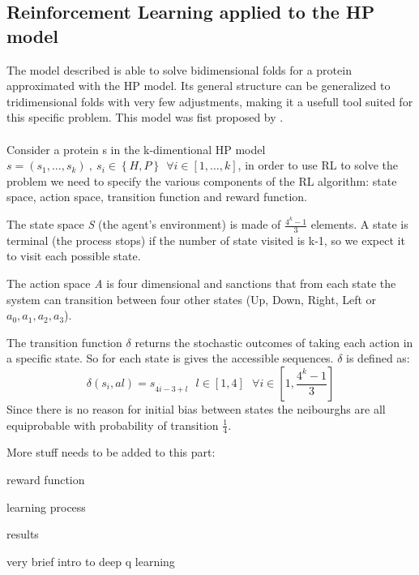 \subsection{Reinforcement Learning applied to the HP model}

The model described is able to solve bidimensional folds for a protein approximated with the HP model. Its general structure can be generalized to tridimensional folds with very few adjustments, making it a usefull tool suited for this specific problem. This model was fist proposed by \cite{czibula2011reinforcement}.
\\
\\
Consider a protein s in the k-dimentional HP model $s = \left(s_1, \ldots, s_k\right) \ , \ s_i \in \left\{H, P\right\} \ \ \forall i \in \left[1,\ldots,k\right]$, in order to use RL to solve the problem we need to specify the various components of the RL algorithm: state space, action space, transition function and reward function.

The state space \emph{S} (the agent’s environment) is made of $\frac{4^{k}-1}{3}$ elements. A state is terminal (the process stops) if the number of state visited is k-1, so we expect it to visit each possible state. 

The action space \emph{A} is four dimensional and sanctions that from each state the system can transition between four other states (Up, Down, Right, Left or $a_{0}, a_{1}, a_{2}, a_{3}$).

The transition function $\delta$ returns the stochastic outcomes of taking each action in a specific state. So for each state is gives the accessible sequences. $\delta$ is defined as:
\begin{equation}
\delta(s_{i},a{l})=s_{4 \dot i - 3 + l} \ \ \ l \in [1, 4] \ \ \ \forall i \in [1,\frac{4^{k}-1}{3}]
\end{equation}
Since there is no reason for initial bias between states the neibourghs are all equiprobable with probability of transition $\frac{1}{4}$.

More stuff needs to be added to this part:

reward function 

learning process

results

very brief intro to deep q learning

